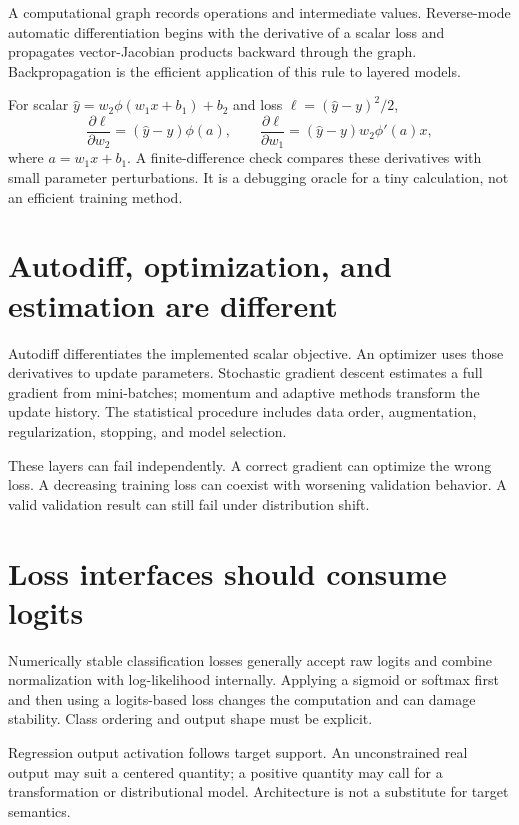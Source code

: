 A computational graph records operations and intermediate values. Reverse-mode
automatic differentiation begins with the derivative of a scalar loss and
propagates vector-Jacobian products backward through the graph. Backpropagation
is the efficient application of this rule to layered models.

For scalar $\widehat y=w_2\phi(w_1x+b_1)+b_2$ and loss
$\ell=(\widehat y-y)^2/2$,
\[
\frac{\partial\ell}{\partial w_2}=(\widehat y-y)\phi(a),\qquad
\frac{\partial\ell}{\partial w_1}=(\widehat y-y)w_2\phi'(a)x,
\]
where $a=w_1x+b_1$. A finite-difference check compares these derivatives with
small parameter perturbations. It is a debugging oracle for a tiny calculation,
not an efficient training method.


\section{Autodiff, optimization, and estimation are different}

Autodiff differentiates the implemented scalar objective. An optimizer uses
those derivatives to update parameters. Stochastic gradient descent estimates a
full gradient from mini-batches; momentum and adaptive methods transform the
update history. The statistical procedure includes data order, augmentation,
regularization, stopping, and model selection.

These layers can fail independently. A correct gradient can optimize the wrong
loss. A decreasing training loss can coexist with worsening validation behavior.
A valid validation result can still fail under distribution shift.

\section{Loss interfaces should consume logits}

Numerically stable classification losses generally accept raw logits and
combine normalization with log-likelihood internally. Applying a sigmoid or
softmax first and then using a logits-based loss changes the computation and can
damage stability. Class ordering and output shape must be explicit.

Regression output activation follows target support. An unconstrained real
output may suit a centered quantity; a positive quantity may call for a
transformation or distributional model. Architecture is not a substitute for
target semantics.

